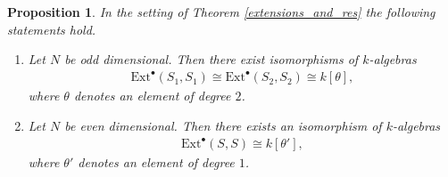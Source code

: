 \documentclass[a4paper, twoside, 11pt]{amsart}
\newtheorem{proposition}[theorem]{Proposition}
\theoremstyle{definition}
\theoremstyle{remark}
\numberwithin{equation}{theorem}
\begin{document}
\begin{proposition}\label{technical_heart}
   In the setting of Theorem \ref{extensions_and_res} the following statements hold.
    \begin{enumerate}[label=\roman*)]
        \item Let $N$ be odd dimensional. Then there exist isomorphisms of $k$-algebras
        \begin{equation*}
        \begin{aligned}
            \mathrm{Ext}^{\bullet}(S_1,S_1) \cong \mathrm{Ext}^{\bullet}(S_2,S_2)  \cong k[\theta],
        \end{aligned}
    \end{equation*}
    where $\theta$ denotes an element of degree $2$.
    \item Let $N$ be even dimensional. Then there exists an isomorphism of $k$-algebras
        \begin{equation*}
        \begin{aligned}
            \mathrm{Ext}^{\bullet}(S,S) \cong k[\theta'],
        \end{aligned}
    \end{equation*}
    where $\theta'$ denotes an element of degree $1$.
    \end{enumerate}
\end{proposition}
\end{document}
